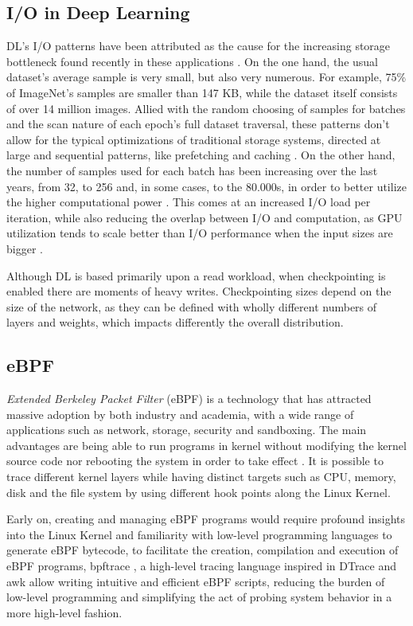 \documentclass[conference]{IEEEtran}
\begin{document}
\subsection{I/O in Deep Learning}

DL's I/O patterns have been attributed as the cause for the increasing storage bottleneck found recently in these applications \cite{beegfs}. On the one hand, the usual dataset's average sample is very small, but also very numerous. For example, 75\% of ImageNet's samples are smaller than 147 KB, while the dataset itself consists of over 14 million images. Allied with the random choosing of samples for batches and the scan nature of each epoch's full dataset traversal, these patterns don't allow for the typical optimizations of traditional storage systems, directed at large and sequential patterns, like prefetching and caching \cite{initial}. On the other hand, the number of samples used for each batch has been increasing over the last years, from 32, to 256 and, in some cases, to the 80.000s, in order to better utilize the higher computational power \cite{nvme}. This comes at an increased I/O load per iteration, while also reducing the overlap between I/O and computation, as GPU utilization tends to scale better than I/O performance when the input sizes are bigger \cite{TFbenchmark}.

Although DL is based primarily upon a read workload, when checkpointing is enabled there are moments of heavy writes. Checkpointing sizes depend on the size of the network, as they can be defined with wholly different numbers of layers and weights, which impacts differently the overall distribution.

\subsection{eBPF}

\textit{Extended Berkeley Packet Filter} (eBPF) is a technology that has attracted massive adoption by both industry and academia, with a wide range of applications such as network, storage, security and sandboxing.
The main advantages are being able to run programs in kernel without modifying the kernel source code nor rebooting the system in order to take effect \cite{eBPFSurvey}.
It is possible to trace different kernel layers while having distinct targets such as CPU, memory, disk and the file system by using different hook points along the Linux Kernel.

Early on, creating and managing eBPF programs would require profound insights into the Linux Kernel and familiarity with low-level programming languages to generate eBPF bytecode,
to facilitate the creation, compilation and execution of eBPF programs, bpftrace \cite{bpftrace}, a high-level tracing language inspired in DTrace and awk allow writing intuitive and efficient eBPF scripts,
reducing the burden of low-level programming and simplifying the act of probing system behavior in a more high-level fashion. \cite{eBPFSurvey2} 
\end{document}
